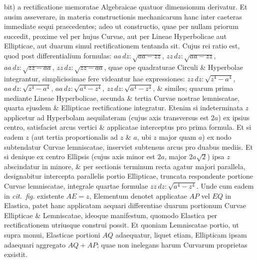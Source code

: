 \documentclass{article}
\begin{document}
bit) a rectificatione memoratae Algebraicae quatuor dimensionum derivatur. Et ausim asseverare, in
materia constructionis mechanicarum hanc inter caeteras immediate sequi praecedentes; adeo ut
constructio, quae per nullam priorum succedit, proxime vel per hujus Curvae, aut per Lineae
Hyperbolicae aut Ellipticae, aut duarum simul rectificationem tentanda sit. Cujus rei ratio est,
quod post differentialium formulas: $aa\,dz : \sqrt{aa - zz}$, $zz\,dz : \sqrt{aa - zz}$,
$aa\,dz : \sqrt{zz - aa}$, $zz\,dz : \sqrt{zz - aa}$, quae ope quadraturae Circuli \& Hyperbolae
integrantur, simplicissimae fere videantur hae expressiones: $zz\,dz : \sqrt{z^{4}-a^{4}}$,
$aa\,dz : \sqrt{z^{4}-a^{4}}$, $aa\,dz : \sqrt{a^{4}-z^{4}}$, $zz\,dz : \sqrt{a^{4}-z^{4}}$, \&
similes; quarum prima mediante Lineae Hyperbolicae, secunda \& tertia Curvae nostrae lemniscatae,
quarta ejusdem \& Ellipticae rectificatione integratur. Etenim si indeterminata $z$ applicetur ad
Hyperbolam aequilateram (cujus axis transversus est $2a$) ex ipsius centro, satisfaciet arcus
vertici \& applicatae interceptus pro prima formula. Et si eadem $z$ (aut tertia proportionalis ad
$z$ \& $a$, ubi $z$ major quam $a$) ex nodo subtendatur Curvae lemniscatae, inserviet subtensus
arcus pro duabus mediis. Et si denique ex centro Ellipsis (cujus axis minor est $2a$, major
$2a\sqrt{2}$) ipsa $z$ abscindatur in minore, \& per sectionis terminum recta agatur majori
parallela, designabitur intercepta parallelis portio Ellipticae, truncata respondente portione
Curvae lemniscatae, integrale quartae formulae $zz\,dz : \sqrt{a^{4}-z^{4}}$. Unde cum eadem in
\emph{cit.\ fig.} existente $AE = z$, Elementum denotet applicatae $AP$ vel $EQ$ in Elastica, patet
hanc applicatam aequari differentiae duarum portionum Curvae Ellipticae \& Lemniscatae, ideoque
manifestum, quomodo Elastica per rectificationem utriusque construi possit. Et quoniam Lemniscatae
portio, ut supra monui, Elasticae portioni $AQ$ adaequatur, liquet etiam, Ellipticam ipsam adaequari
aggregato $AQ + AP$; quae non inelegans harum Curvarum proprietas exsistit.
\end{document}
